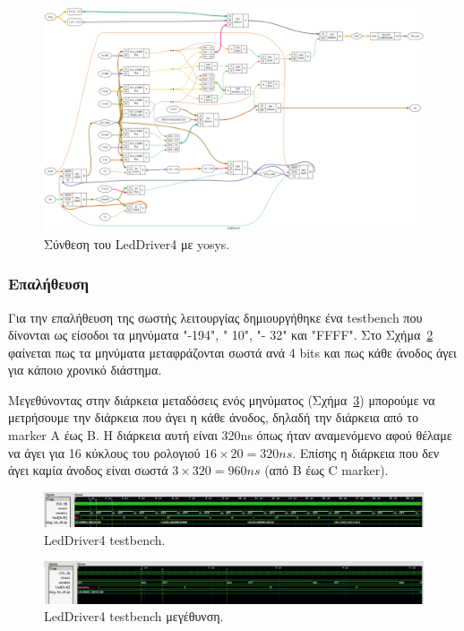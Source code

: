 \documentclass[../main.tex]{subfiles}
\begin{document}
\begin{figure}[H]
  \begin{center}
    \includegraphics[width=\textwidth]{../../diagrams/LedDriver4.png}
  \end{center}
  \caption{Σύνθεση του LedDriver4 με yosys.}
  \label{fig:module_led_driver}
\end{figure}

\subsubsection*{Επαλήθευση}

Για την επαλήθευση της σωστής λειτουργίας δημιουργήθηκε ένα testbench που
δίνονται ως είσοδοι τα μηνύματα "-194", "  10", "- 32" και "FFFF". Στο
Σχήμα~\ref{fig:tb_led_driver_zoomed_out} φαίνεται πως τα μηνύματα μεταφράζονται
σωστά ανά 4 bits και πως κάθε άνοδος άγει για κάποιο χρονικό διάστημα.

Μεγεθύνοντας στην διάρκεια μεταδόσεις ενός μηνύματος
(Σχήμα~\ref{fig:tb_led_driver}) μπορούμε να μετρήσουμε την διάρκεια που άγει η
κάθε άνοδος, δηλαδή την διάρκεια από το marker A έως B. Η διάρκεια αυτή είναι
320ns όπως ήταν αναμενόμενο αφού θέλαμε να άγει για 16 κύκλους του ρολογιού
$16\times20=320ns$. Επίσης η διάρκεια που δεν άγει καμία άνοδος είναι σωστά
$3\times320=960ns$ (από B έως C marker).

\begin{figure}[H]
  \begin{center}
    \includegraphics[width=\textwidth]{../images/led_driver_tb_zoomed_out.png}
  \end{center}
  \caption{LedDriver4 testbench.}
  \label{fig:tb_led_driver_zoomed_out}
\end{figure}

\begin{figure}[H]
  \begin{center}
    \includegraphics[width=\textwidth]{../images/led_driver_tb.png}
  \end{center}
  \caption{LedDriver4 testbench μεγέθυνση.}
  \label{fig:tb_led_driver}
\end{figure}
\end{document}
